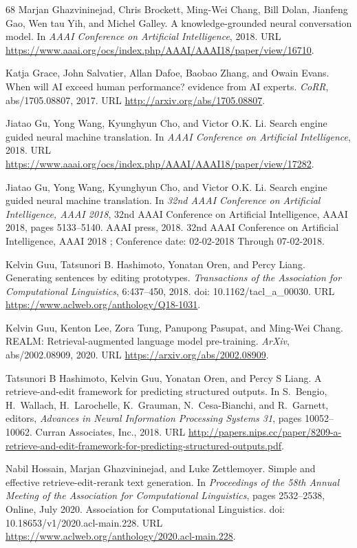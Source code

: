 \documentclass[10pt,letterpaper]{article}
\begin{document}
{\begin{thebibliography}{68}
 Marjan Ghazvininejad, Chris Brockett, Ming-Wei Chang, Bill Dolan,
Jianfeng Gao, Wen tau Yih, and Michel Galley. A knowledge-grounded neural
conversation model. In \emph{AAAI Conference on Artificial Intelligence}, 2018.
URL \url{https://www.aaai.org/ocs/index.php/AAAI/AAAI18/paper/view/16710}.

 Katja Grace, John Salvatier, Allan Dafoe, Baobao Zhang, and Owain
Evans. When will AI exceed human performance? evidence from AI experts.
\emph{CoRR}, abs/1705.08807, 2017. URL \url{http://arxiv.org/abs/1705.08807}.

 Jiatao Gu, Yong Wang, Kyunghyun Cho, and Victor O.K. Li. Search
engine guided neural machine translation. In \emph{AAAI Conference on
Artificial Intelligence}, 2018. URL
\url{https://www.aaai.org/ocs/index.php/AAAI/AAAI18/paper/view/17282}.

 Jiatao Gu, Yong Wang, Kyunghyun Cho, and Victor O.K. Li. Search
engine guided neural machine translation. In \emph{32nd AAAI Conference on
Artificial Intelligence, AAAI 2018}, 32nd AAAI Conference on Artificial
Intelligence, AAAI 2018, pages 5133--5140. AAAI press, 2018. 32nd AAAI
Conference on Artificial Intelligence, AAAI 2018 ; Conference date: 02-02-2018
Through 07-02-2018.

 Kelvin Guu, Tatsunori B. Hashimoto, Yonatan Oren, and Percy
Liang. Generating sentences by editing prototypes. \emph{Transactions of the
Association for Computational Linguistics}, 6:437--450, 2018. doi:
10.1162/tacl\_a\_00030. URL \url{https://www.aclweb.org/anthology/Q18-1031}.

 Kelvin Guu, Kenton Lee, Zora Tung, Panupong Pasupat, and Ming-Wei
Chang. REALM: Retrieval-augmented language model pre-training. \emph{ArXiv},
abs/2002.08909, 2020. URL \url{https://arxiv.org/abs/2002.08909}.

 Tatsunori B Hashimoto, Kelvin Guu, Yonatan Oren, and Percy S
Liang. A retrieve-and-edit framework for predicting structured outputs. In
S.~Bengio, H.~Wallach, H.~Larochelle, K.~Grauman, N.~Cesa-Bianchi, and
R.~Garnett, editors, \emph{Advances in Neural Information Processing Systems
31}, pages 10052--10062. Curran Associates, Inc., 2018. URL
\url{http://papers.nips.cc/paper/8209-a-retrieve-and-edit-framework-for-predicting-structured-outputs.pdf}.

 Nabil Hossain, Marjan Ghazvininejad, and Luke Zettlemoyer. Simple
and effective retrieve-edit-rerank text generation. In \emph{Proceedings of the
58th Annual Meeting of the Association for Computational Linguistics}, pages
2532--2538, Online, July 2020. Association for Computational Linguistics. doi:
10.18653/v1/2020.acl-main.228. URL
\url{https://www.aclweb.org/anthology/2020.acl-main.228}.


\end{thebibliography}}
\end{document}

